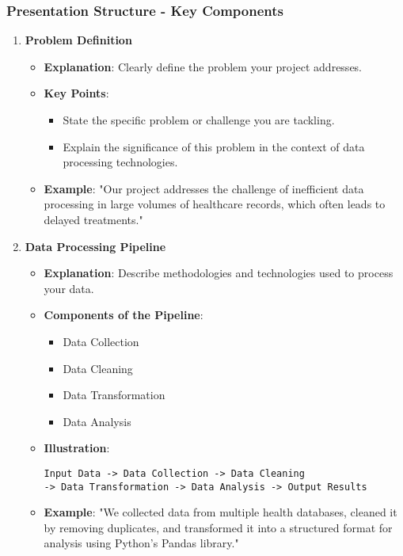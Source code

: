 \documentclass{beamer}
\begin{document}
\begin{frame}[fragile]
    \frametitle{Presentation Structure - Key Components}
    \begin{enumerate}
        \item \textbf{Problem Definition}
            \begin{itemize}
                \item \textbf{Explanation}: Clearly define the problem your project addresses.
                \item \textbf{Key Points}:
                    \begin{itemize}
                        \item State the specific problem or challenge you are tackling.
                        \item Explain the significance of this problem in the context of data processing technologies.
                    \end{itemize}
                \item \textbf{Example}: "Our project addresses the challenge of inefficient data processing in large volumes of healthcare records, which often leads to delayed treatments."
            \end{itemize}

        \item \textbf{Data Processing Pipeline}
            \begin{itemize}
                \item \textbf{Explanation}: Describe methodologies and technologies used to process your data.
                \item \textbf{Components of the Pipeline}:
                    \begin{itemize}
                        \item Data Collection
                        \item Data Cleaning
                        \item Data Transformation
                        \item Data Analysis
                    \end{itemize}
                \item \textbf{Illustration}:
                    \begin{lstlisting}
Input Data -> Data Collection -> Data Cleaning 
-> Data Transformation -> Data Analysis -> Output Results
                    \end{lstlisting}
                \item \textbf{Example}: "We collected data from multiple health databases, cleaned it by removing duplicates, and transformed it into a structured format for analysis using Python's Pandas library."
            \end{itemize}
    \end{enumerate}
\end{frame}
\end{document}
